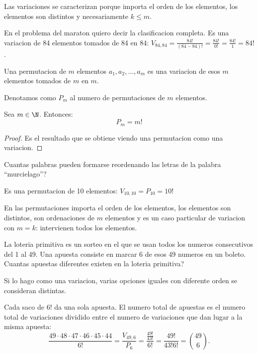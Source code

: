 Las variaciones se caracterizan porque importa el orden de los elementos, los elementos son distintos y necesariamente \(k \leq m \).

\begin{example}
	En el problema del maraton quiero decir la clasificacion completa. Es una variacion de 84 elementos tomados de 84 en 84:  \(V_{84,84} = \frac{84!}{(84-84)!}= \frac{84!}{0!} = \frac{84!}{1} = 84!\).
\end{example}

\begin{definition}
	Una permutacion de \(m \) elementos \(a_1,a_2, \ldots, a_m \) es una variacion de esos \(m \) elementos tomados de \(m \) en \(m \).

	Denotamos como \(P_m \) al numero de permutaciones de \(m \) elementos.
\end{definition}

\begin{theorem}
	Sea \(m \in \N \). Entonces:
	\[
		P_m = m!
	\]
\end{theorem}
\begin{proof}
	Es el resultado que se obtiene viendo una permutacion como una variacion.
\end{proof}

\begin{example}
	Cuantas palabras pueden formarse reordenando las letras de la palabra ``murcielago''?

	Es una permutacion de 10 elementos: \(V_{10,10} = P_{10} = 10!\)
\end{example}

En las permutaciones importa el orden de los elementos, los elementos son distintos, son ordenaciones de \(m \) elementos y es un caso particular de variacion con \(m = k \): intervienen todos los elementos.

\vspace{0.2cm}
\begin{example}
	La loteria primitiva es un sorteo en el que se usan todos los numeros consecutivos del 1 al 49. Una apuesta consiste en marcar 6 de esos 49 numeros en un boleto. Cuantas apuestas diferentes existen en la loteria primitiva?

	Si lo hago como una variacion, varias opciones iguales con diferente orden se consideran distintas.

	Cada saco de \(6! \) da una sola apuesta. El numero total de apuestas es el numero total de variaciones dividido entre el numero de variaciones que dan lugar a la misma apuesta:
	\[
		\frac{49 \cdot 48 \cdot 47 \cdot 46 \cdot 45 \cdot 44}{6!} = \frac{V_{49,6}}{P_6} = \frac{\frac{49!}{43!}}{6!} = \frac{49!}{43!6!} = \binom{49}{6}.
	\]
\end{example}

